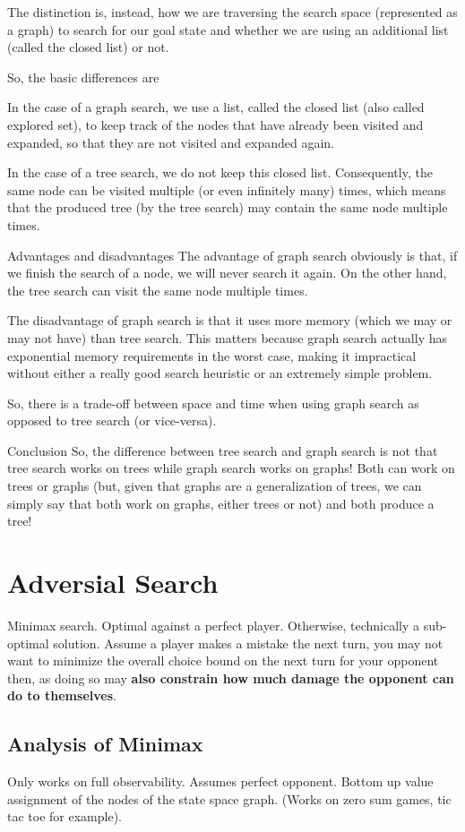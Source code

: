 \documentclass{article}
\begin{document}
The distinction is, instead, how we are traversing the search space (represented as a graph) to search for our goal state and whether we are using an additional list (called the closed list) or not.

So, the basic differences are

In the case of a graph search, we use a list, called the closed list (also called explored set), to keep track of the nodes that have already been visited and expanded, so that they are not visited and expanded again.

In the case of a tree search, we do not keep this closed list. Consequently, the same node can be visited multiple (or even infinitely many) times, which means that the produced tree (by the tree search) may contain the same node multiple times.

Advantages and disadvantages
The advantage of graph search obviously is that, if we finish the search of a node, we will never search it again. On the other hand, the tree search can visit the same node multiple times.

The disadvantage of graph search is that it uses more memory (which we may or may not have) than tree search. This matters because graph search actually has exponential memory requirements in the worst case, making it impractical without either a really good search heuristic or an extremely simple problem.

So, there is a trade-off between space and time when using graph search as opposed to tree search (or vice-versa).

Conclusion
So, the difference between tree search and graph search is not that tree search works on trees while graph search works on graphs! Both can work on trees or graphs (but, given that graphs are a generalization of trees, we can simply say that both work on graphs, either trees or not) and both produce a tree!

\section{Adversial Search}
Minimax search. Optimal against a perfect player. Otherwise, technically a sub-optimal solution. Assume a player makes a mistake the next turn, you may not want to minimize the overall choice bound on the next turn for your opponent then, as doing so may \textbf{also constrain how much damage the opponent can do to themselves}.

\subsection{Analysis of Minimax}
Only works on full observability. Assumes perfect opponent. Bottom up value assignment of the nodes of the state space graph. (Works on zero sum games, tic tac toe for example).
\end{document}
